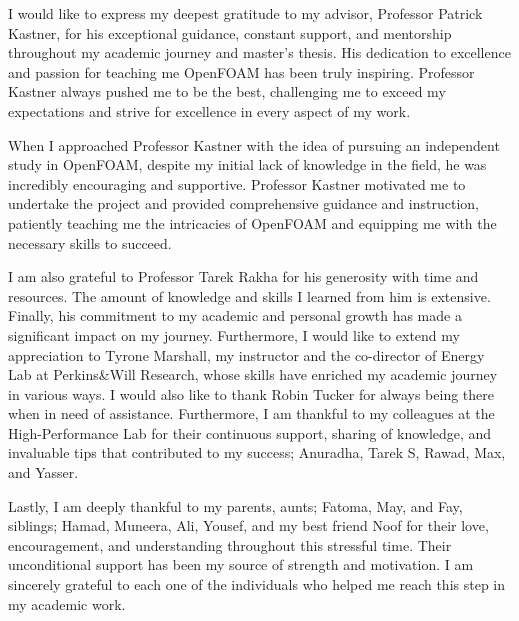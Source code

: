 
\begin{acknowledgments}

I would like to express my deepest gratitude to my advisor, Professor Patrick Kastner, for his exceptional guidance, constant support, and mentorship throughout my academic journey and master's thesis. His dedication to excellence and passion for teaching me OpenFOAM has been truly inspiring. Professor Kastner always pushed me to be the best, challenging me to exceed my expectations and strive for excellence in every aspect of my work. 

When I approached Professor Kastner with the idea of pursuing an independent study in OpenFOAM, despite my initial lack of knowledge in the field, he was incredibly encouraging and supportive. Professor Kastner motivated me to undertake the project and provided comprehensive guidance and instruction, patiently teaching me the intricacies of OpenFOAM and equipping me with the necessary skills to succeed.

I am also grateful to Professor Tarek Rakha for his generosity with time and resources. The amount of knowledge and skills I learned from him is extensive. Finally, his commitment to my academic and personal growth has made a significant impact on my journey. Furthermore, I would like to extend my appreciation to Tyrone Marshall, my instructor and the co-director of Energy Lab at Perkins\&Will Research, whose skills have enriched my academic journey in various ways. I would also like to thank Robin Tucker for always being there when in need of assistance. Furthermore, I am thankful to my colleagues at the High-Performance Lab for their continuous support, sharing of knowledge, and invaluable tips that contributed to my success; Anuradha, Tarek S, Rawad, Max, and Yasser.

Lastly, I am deeply thankful to my parents, aunts; Fatoma, May, and Fay, siblings; Hamad, Muneera, Ali, Yousef, and my best friend Noof for their love, encouragement, and understanding throughout this stressful time. Their unconditional support has been my source of strength and motivation.
I am sincerely grateful to each one of the individuals who helped me reach this step in my academic work.



\end{acknowledgments}
